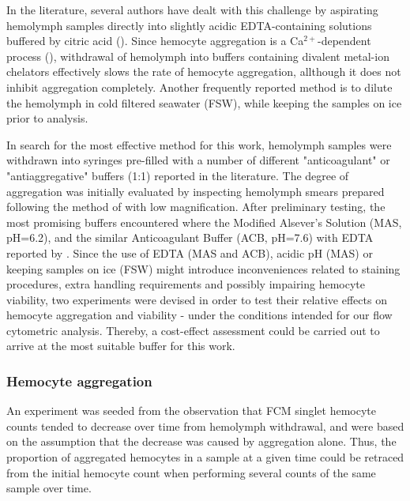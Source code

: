 In the literature, several authors have dealt with this challenge by aspirating hemolymph samples directly into slightly acidic EDTA-containing solutions buffered by citric acid (\cite{Söderhall1983, Bachere1988, LeFoll2010}). Since hemocyte aggregation is a Ca$^{2+}$-dependent process (\cite{Torreilles1999, Chen1995}), withdrawal of hemolymph into buffers containing divalent metal-ion chelators effectively slows the rate of hemocyte aggregation, allthough it does not inhibit aggregation completely. Another frequently reported method is to dilute the hemolymph in cold filtered seawater (FSW), while keeping the samples on ice prior to analysis.

In search for the most effective method for this work, hemolymph samples were withdrawn into syringes pre-filled with a number of different "anticoagulant" or "antiaggregative" buffers (1:1) reported in the literature. The degree of aggregation was initially evaluated by inspecting hemolymph smears prepared following the method of \cite{Bolognesi2012} with low magnification. After preliminary testing, the most promising buffers encountered where the Modified Alsever's Solution (MAS, pH=6.2), and the similar Anticoagulant Buffer (ACB, pH=7.6) with EDTA reported by \cite{Pipe1997}. Since the use of EDTA (MAS and ACB), acidic pH (MAS) or keeping samples on ice (FSW) might introduce inconveniences related to staining procedures, extra handling requirements and possibly impairing hemocyte viability, two experiments were devised in order to test their relative effects on hemocyte aggregation and viability - under the conditions intended for our flow cytometric analysis. Thereby, a cost-effect assessment could be carried out to arrive at the most suitable buffer for this work.

\subsubsection{Hemocyte aggregation}
An experiment was seeded from the observation that FCM singlet hemocyte counts tended to decrease over time from hemolymph withdrawal, and were based on the assumption that the decrease was caused by aggregation alone. Thus, the proportion of aggregated hemocytes in a sample at a given time could be retraced from the initial hemocyte count when performing several counts of the same sample over time. 

